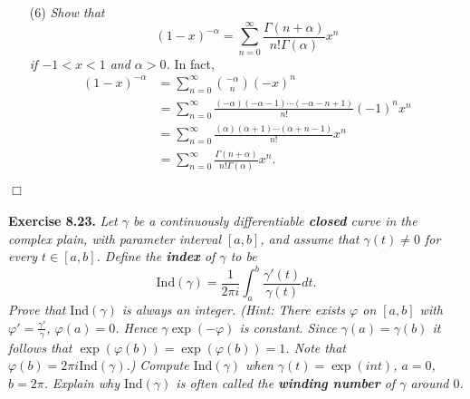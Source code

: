 \documentclass{article}
\begin{document}
\begin{enumerate}
\item[(6)]
\emph{Show that
\[
  (1-x)^{-\alpha} = \sum_{n=0}^{\infty} \frac{\Gamma(n+\alpha)}{n!\Gamma(\alpha)} x^n
\]
if $-1<x<1$ and $\alpha > 0$.}
In fact,
\begin{align*}
  (1-x)^{-\alpha}
  &= \sum_{n=0}^{\infty} {-\alpha \choose n} (-x)^n \\
  &= \sum_{n=0}^{\infty} \frac{(-\alpha)(-\alpha-1)\cdots(-\alpha-n+1)}{n!} (-1)^n x^n \\
  &= \sum_{n=0}^{\infty} \frac{(\alpha)(\alpha+1)\cdots(\alpha+n-1)}{n!} x^n \\
  &= \sum_{n=0}^{\infty} \frac{\Gamma(n+\alpha)}{n!\Gamma(\alpha)} x^n.
\end{align*}
\end{enumerate}
$\Box$ \\\\






\textbf{Exercise 8.23.}
\emph{Let $\gamma$ be a continuously differentiable \textbf{closed} curve in the complex plain,
with parameter interval $[a,b]$,
and assume that $\gamma(t) \neq 0$ for every $t \in [a,b]$.
Define the \textbf{index} of $\gamma$ to be
\[
  \mathrm{Ind}(\gamma)
  = \frac{1}{2\pi i}\int_{a}^{b} \frac{\gamma'(t)}{\gamma(t)} dt.
\]
Prove that $\mathrm{Ind}(\gamma)$ is always an integer.
(Hint: There exists $\varphi$ on $[a,b]$ with $\varphi' = \frac{\gamma'}{\gamma}$,
$\varphi(a) = 0$.
Hence $\gamma \exp(-\varphi)$ is constant.
Since $\gamma(a) = \gamma(b)$ it follows that $\exp(\varphi(b)) = \exp(\varphi(b)) = 1$.
Note that $\varphi(b) = 2\pi i \mathrm{Ind}(\gamma)$.)}
\emph{Compute $\mathrm{Ind}(\gamma)$ when $\gamma(t) = \exp(int)$, $a=0$, $b=2\pi$.}
\emph{Explain why $\mathrm{Ind}(\gamma)$ is often called the
\textbf{winding number} of $\gamma$ around $0$.} \\
\end{document}
